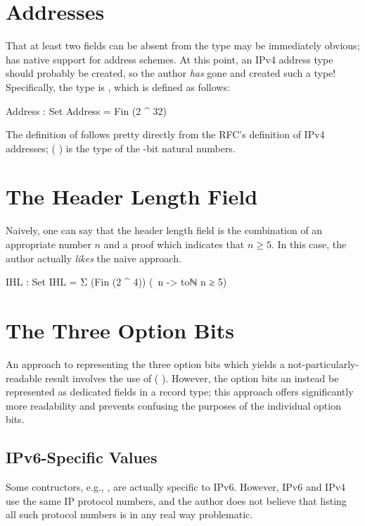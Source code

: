 \documentclass{report}
\begin{document}
\begin{itemize}
\section{Addresses}
That at least two fields can be absent from the  type may be immediately obvious;  has native support for address schemes.  At this point, an IPv4 address type should probably be created, so the author \emph{has} gone and created such a type!  Specifically, the type is , which is defined as follows:

\begin{code}
  Address : Set
  Address = Fin (2 ^ 32)
\end{code}

The definition of  follows pretty directly from the RFC's definition of IPv4 addresses;  \AgdaSymbol( \AgdaOperator{\AgdaFunction{^}} \AgdaSymbol) is the type of the -bit natural numbers.

\section{The Header Length Field}
Naively, one can say that the header length field is the combination of an appropriate  number \(n\) and a proof which indicates that \(n \geq 5\).  In this case, the author actually \emph{likes} the naive approach.

\begin{code}
  IHL : Set
  IHL = Σ (Fin (2 ^ 4)) (\ n -> toℕ n ≥ 5)
\end{code}

\section{The Three Option Bits}
An approach to representing the three option bits which yields a not-particularly-readable result involves the use of  \AgdaSymbol( \AgdaOperator{\AgdaFunction{\circumflex}} \AgdaSymbol).  However, the option bits an instead be represented as dedicated  fields in a record type; this approach offers significantly more readability and prevents confusing the purposes of the individual option bits.

\subsection{IPv6-Specific Values}
Some  contructors, e.g., , are actually specific to IPv6.  However, IPv6 and IPv4 use the same IP protocol numbers, and the author does not believe that listing all such protocol numbers is in any real way problematic.


\end{itemize}
\end{document}
